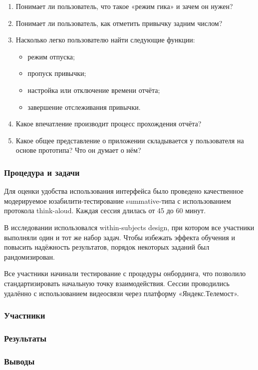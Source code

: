 \documentclass[pdflatex,sn-mathphys-num]{sn-jnl}%
\theoremstyle{thmstyleone}%
\theoremstyle{thmstyletwo}%
\theoremstyle{thmstylethree}%
\begin{document}
\begin{enumerate}
  \item Понимает ли пользователь, что такое «режим гика» и зачем он нужен?
  \item Понимает ли пользователь, как отметить привычку задним числом?
  \item Насколько легко пользователю найти следующие функции:
    \begin{itemize}
      \item режим отпуска;
      \item пропуск привычки;
      \item настройка или отключение времени отчёта;
      \item завершение отслеживания привычки.
    \end{itemize}
  \item Какое впечатление производит процесс прохождения отчёта?
  \item Какое общее представление о приложении складывается у пользователя на основе прототипа? Что он думает о нём?
\end{enumerate}

\subsubsection{Процедура и задачи}

Для оценки удобства использования интерфейса было проведено качественное модерируемое юзабилити-тестирование summative-типа с использованием протокола think-aloud. Каждая сессия длилась от 45 до 60 минут.

В исследовании использовался within-subjects design, при котором все участники выполняли один и тот же набор задач. Чтобы избежать эффекта обучения и повысить надёжность результатов, порядок некоторых заданий был рандомизирован.

Все участники начинали тестирование с процедуры онбординга, что позволило стандартизировать начальную точку взаимодействия. Сессии проводились удалённо с использованием видеосвязи через платформу «Яндекс.Телемост».

\subsubsection{Участники}

\subsubsection{Результаты}

\subsubsection{Выводы}
\end{document}
